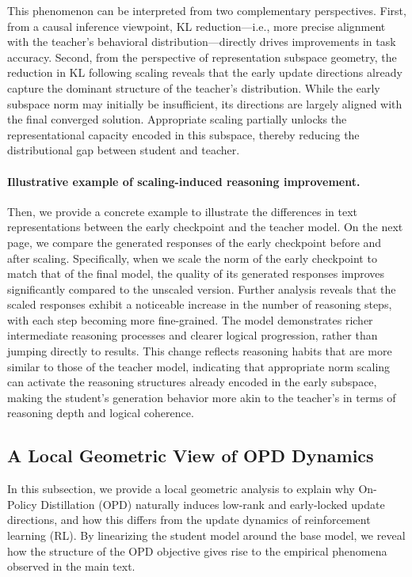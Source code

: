 \documentclass{llmxive}
\begin{document}
This phenomenon can be interpreted from two complementary perspectives. First, from a causal inference viewpoint, KL reduction—i.e., more precise alignment with the teacher’s behavioral distribution—directly drives improvements in task accuracy. Second, from the perspective of representation subspace geometry, the reduction in KL following scaling reveals that the early update directions already capture the dominant structure of the teacher’s distribution. While the early subspace norm may initially be insufficient, its directions are largely aligned with the final converged solution. Appropriate scaling partially unlocks the representational capacity encoded in this subspace, thereby reducing the distributional gap between student and teacher.


\paragraph{Illustrative example of scaling-induced reasoning improvement.}
Then, we provide a concrete example to illustrate the differences in text representations between the early checkpoint and the teacher model. On the next page, we compare the generated responses of the early checkpoint before and after scaling. Specifically, when we scale the norm of the early checkpoint to match that of the final model, the quality of its generated responses improves significantly compared to the unscaled version. Further analysis reveals that the scaled responses exhibit a noticeable increase in the number of reasoning steps, with each step becoming more fine-grained. The model demonstrates richer intermediate reasoning processes and clearer logical progression, rather than jumping directly to results. This change reflects reasoning habits that are more similar to those of the teacher model, indicating that appropriate norm scaling can activate the reasoning structures already encoded in the early subspace, making the student's generation behavior more akin to the teacher's in terms of reasoning depth and logical coherence.


\subsection{A Local Geometric View of OPD Dynamics}
\label{A Linearized View of OPD Dynamics}

In this subsection, we provide a local geometric analysis to explain why On-Policy Distillation (OPD) naturally induces low-rank and early-locked update directions, and how this differs from the update dynamics of reinforcement learning (RL). By linearizing the student model around the base model, we reveal how the structure of the OPD objective gives rise to the empirical phenomena observed in the main text.
\end{document}
